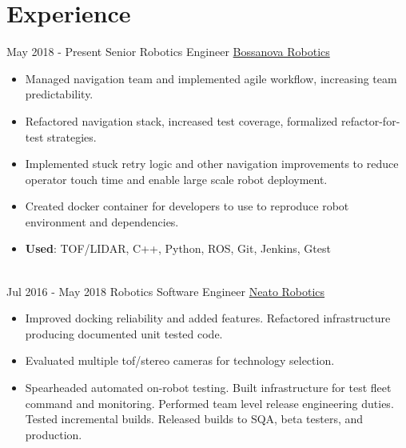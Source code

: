 \documentclass[letterpaper]{twentysecondcv} %
\begin{document}
\makeprofile %


\section{Experience}

\begin{twenty} %
\twentyitem
    	{May 2018 -}
		{Present}
        {Senior Robotics Engineer}
        {\href{http://www.bossanova.com/}{Bossanova Robotics}}
        {}
        {\begin{itemize}
          \item Managed navigation team and implemented agile workflow, increasing team predictability.
          \item Refactored navigation stack, increased test coverage, formalized refactor-for-test strategies.
          \item Implemented stuck retry logic and other navigation improvements to
                reduce operator touch time and enable large scale robot deployment.
          \item Created docker container for developers to use to reproduce robot environment and dependencies.
          \item \textbf{Used}: TOF/LIDAR, C++, Python, ROS, Git, Jenkins, Gtest
        \end{itemize}}
        \\
	\twentyitem
    	{Jul 2016 -}
		{May 2018}
        {Robotics Software Engineer}
        {\href{http://www.neatorobotics.com/}{Neato Robotics}}
        {}
        {
        {\begin{itemize}
        \item Improved docking reliability and added features.
              Refactored infrastructure producing documented unit tested code.
        \item Evaluated multiple tof/stereo cameras for technology selection.
        \item Spearheaded automated on-robot testing.
              Built infrastructure for test fleet command and monitoring.
              Performed team level release engineering duties.
              Tested incremental builds.
              Released builds to SQA, beta testers, and production.

\end{itemize}}}
\end{twenty}
\end{document}
